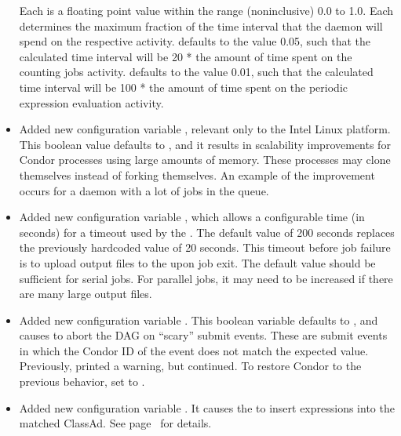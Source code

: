 \begin{itemize}
  Each is a floating point value within the range
  (noninclusive) 0.0 to 1.0.
  Each determines the maximum fraction of the time interval that the 
   daemon  will spend on the respective
  activity.
   defaults to the value 0.05,
  such that the calculated time interval will be 20 * the amount
  of time spent on the counting jobs activity.
   defaults to the value 0.01,
  such that the calculated time interval will be 100 * the amount
  of time spent on the periodic expression evaluation activity.

\item Added new configuration variable 
  , relevant only to the
  Intel Linux platform.  
  This boolean value defaults to , and it results in scalability
  improvements for Condor processes using large amounts of memory.
  These processes may clone themselves instead of forking themselves.
  An example of the improvement occurs for a 
  daemon with a lot of jobs in the queue.

\item Added new configuration variable ,
  which allows a configurable time (in seconds) for a timeout used by the 
  .
  The default value of 200 seconds replaces the previously hardcoded
  value of 20 seconds.
  This timeout before job failure is to upload output files to the
   upon job exit.
  The default value should be sufficient for serial jobs.
  For parallel jobs, it may need to
  be increased if there are many large output files.

\item Added new configuration variable .
  This boolean variable defaults to , and causes
   to abort the DAG on ``scary'' submit events.
  These are submit events in which
  the Condor ID of the event does not match the expected value.
  Previously,  printed a warning, but continued.
  To restore Condor to the previous behavior,
  set  to .

\item Added new configuration variable .
  It causes the  to
  insert expressions into the matched ClassAd.  See
  page~\pageref{param:NegotiatorMatchExprs} for details.


\end{itemize}
